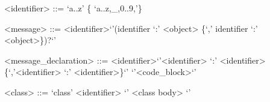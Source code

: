 \documentclass{eplDoc}
\begin{document}
\maketitle
\newpage

\begin{grammar}
<identifier> ::= `a..z' \{ `a..z,\_,0..9,'\} 

<message> ::= <identifier>`{'(identifier `:' <object> \{`,' identifier `:' <object>\})?`}'

<message\_declaration> ::= <identifier>`{'<identifier> `:' <identifier> \{`,'<identifier> `:' <identifier>\}`}' `{'<code\_block>`}'

<class> ::= `class' <identifier> `{' <class body> `}'
\end{grammar}
\end{document}
